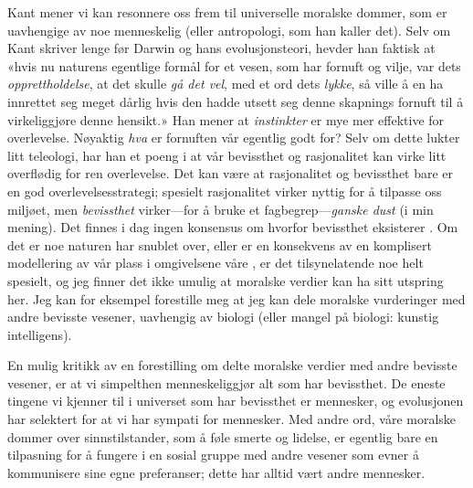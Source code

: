 \documentclass[a4paper,norsk]{article}
\begin{document}
Kant mener vi kan resonnere oss frem til universelle moralske dommer, som er
uavhengige av noe menneskelig (eller antropologi, som han kaller det). Selv om
Kant skriver lenge før Darwin og hans evolusjonsteori, hevder han faktisk at
«hvis nu naturens egentlige formål for et vesen, som har fornuft og vilje, var
dets \emph{opprettholdelse}, at det skulle \emph{gå det vel}, med et ord dets
\emph{lykke}, så ville å en ha innrettet seg meget dårlig hvis den hadde utsett
seg denne skapnings fornuft til å virkeliggjøre denne hensikt.»
\autocite[4:395]{kant} Han mener at \emph{instinkter} er mye mer effektive for
overlevelse. Nøyaktig \emph{hva} er fornuften vår egentlig godt for? Selv om
dette lukter litt teleologi, har han et poeng i at vår bevissthet og
rasjonalitet kan virke litt overflødig for ren overlevelse. Det kan være at
rasjonalitet og bevissthet bare er en god overlevelsesstrategi; spesielt
rasjonalitet virker nyttig for å tilpasse oss miljøet, men \emph{bevissthet}
virker---for å bruke et fagbegrep---\emph{ganske dust} (i min mening). Det
finnes i dag ingen konsensus om hvorfor bevissthet eksisterer
\autocite{sep-consciousness}. Om det er noe naturen har snublet over, eller er
en konsekvens av en komplisert modellering av vår plass i omgivelsene våre
\autocite[kap. 4]{dawkins}, er det tilsynelatende noe helt spesielt, og jeg finner det
ikke umulig at moralske verdier kan ha sitt utspring her. Jeg kan for eksempel
forestille meg at jeg kan dele moralske vurderinger med andre bevisste vesener,
uavhengig av biologi (eller mangel på biologi: kunstig intelligens).

En mulig kritikk av en forestilling om delte moralske verdier med andre
bevisste vesener, er at vi simpelthen menneskeliggjør alt som har bevissthet.
De eneste tingene vi kjenner til i universet som har bevissthet er mennesker,
og evolusjonen har selektert for at vi har sympati for mennesker. Med andre
ord, våre moralske dommer over sinnstilstander, som å føle smerte og lidelse,
er egentlig bare en tilpasning for å fungere i en sosial gruppe med andre
vesener som evner å kommunisere sine egne preferanser; dette har alltid vært
andre mennesker.

\printbibliography
\end{document}
